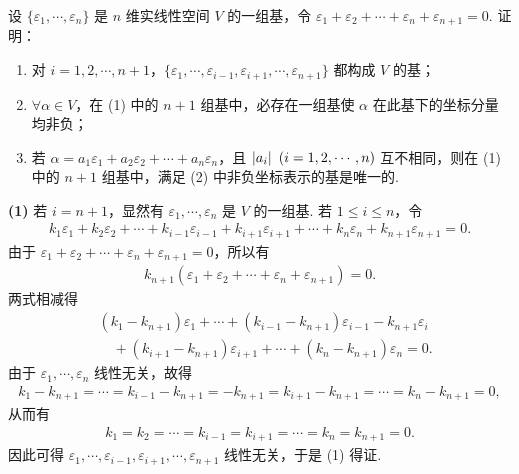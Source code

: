设 $\{\varepsilon_1,\cdots,\varepsilon_n\}$ 是 $n$ 维实线性空间 $V$ 的一组基，令 $\varepsilon_1+\varepsilon_2+\cdots+\varepsilon_n+\varepsilon_{n+1}=0$. 证明：
\begin{enumerate}
  \item 对 $i=1,2,\cdots,n+1$，$\{\varepsilon_1,\cdots,\varepsilon_{i-1},\varepsilon_{i+1},\cdots,\varepsilon_{n+1}\}$ 都构成 $V$ 的基；
  \item $\forall\alpha\in V$，在 (1) 中的 $n+1$ 组基中，必存在一组基使 $\alpha$ 在此基下的坐标分量均非负；
  \item 若 $\alpha=a_1\varepsilon_1+a_2\varepsilon_2+\cdots+a_n\varepsilon_n$，且 $\left|a_i\right|\ (i=1,2,\cdots,n)$ 互不相同，则在 (1) 中的 $n+1$ 组基中，满足 (2) 中非负坐标表示的基是唯一的.
\end{enumerate}
\begin{solution}
\textbf{(1)} 若 $i=n+1$，显然有 $\varepsilon_1,\cdots,\varepsilon_n$ 是 $V$ 的一组基. 若 $1\le i\le n$，令
\begin{align*}
k_1\varepsilon_1+k_2\varepsilon_2+\cdots+k_{i-1}\varepsilon_{i-1}+k_{i+1}\varepsilon_{i+1}+\cdots+k_n\varepsilon_n+k_{n+1}\varepsilon_{n+1}=0.
\end{align*}
由于 $\varepsilon_1+\varepsilon_2+\cdots+\varepsilon_n+\varepsilon_{n+1}=0$，所以有
\begin{align*}
k_{n+1}(\varepsilon_1+\varepsilon_2+\cdots+\varepsilon_n+\varepsilon_{n+1})=0.
\end{align*}
两式相减得
\begin{align*}
&(k_1-k_{n+1})\varepsilon_1+\cdots+(k_{i-1}-k_{n+1})\varepsilon_{i-1}-k_{n+1}\varepsilon_i\\
&\quad+(k_{i+1}-k_{n+1})\varepsilon_{i+1}+\cdots+(k_n-k_{n+1})\varepsilon_n=0.
\end{align*}
由于 $\varepsilon_1,\cdots,\varepsilon_n$ 线性无关，故得
\begin{align*}
k_1-k_{n+1}=\cdots=k_{i-1}-k_{n+1}=-k_{n+1}=k_{i+1}-k_{n+1}=\cdots=k_n-k_{n+1}=0,
\end{align*}
从而有
\begin{align*}
k_1=k_2=\cdots=k_{i-1}=k_{i+1}=\cdots=k_n=k_{n+1}=0.
\end{align*}
因此可得 $\varepsilon_1,\cdots,\varepsilon_{i-1},\varepsilon_{i+1},\cdots,\varepsilon_{n+1}$ 线性无关，于是 (1) 得证.


\end{solution}
